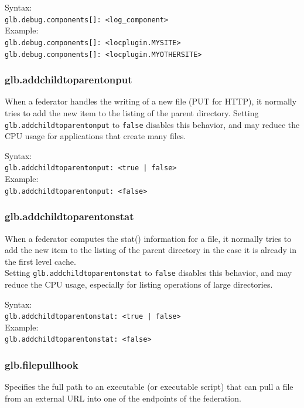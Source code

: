 \documentclass[12pt]{article} %
\begin{document}
 Syntax:\\

\lstinline"glb.debug.components[]: <log_component>"\\

 Example:\\
\lstinline"glb.debug.components[]: <locplugin.MYSITE>"\\
\lstinline"glb.debug.components[]: <locplugin.MYOTHERSITE>"\\


\subsubsection{glb.addchildtoparentonput}
 When a federator handles the writing of a new file (PUT for HTTP), it normally tries to add the new item to the listing
of the parent directory. Setting \lstinline"glb.addchildtoparentonput" to \lstinline"false" disables this behavior, and may
reduce the CPU usage for applications that create many files.

 Syntax:\\

\lstinline"glb.addchildtoparentonput: <true | false>"\\

 Example:\\
\lstinline"glb.addchildtoparentonput: <false>"\\


\subsubsection{glb.addchildtoparentonstat}
 When a federator computes the stat() information for a file, it normally tries to add the new item to the listing
of the parent directory in the case it is already in the first level cache.\\
Setting \lstinline"glb.addchildtoparentonstat" to \lstinline"false" disables this behavior, and may reduce the CPU usage, especially for listing operations of large directories.

 Syntax:\\

\lstinline"glb.addchildtoparentonstat: <true | false>"\\

 Example:\\
\lstinline"glb.addchildtoparentonstat: <false>"\\

\subsubsection{glb.filepullhook}
 Specifies the full path to an executable (or executable script) that can pull a file from an external URL into one of the endpoints of the federation.\\
 
\end{document}
